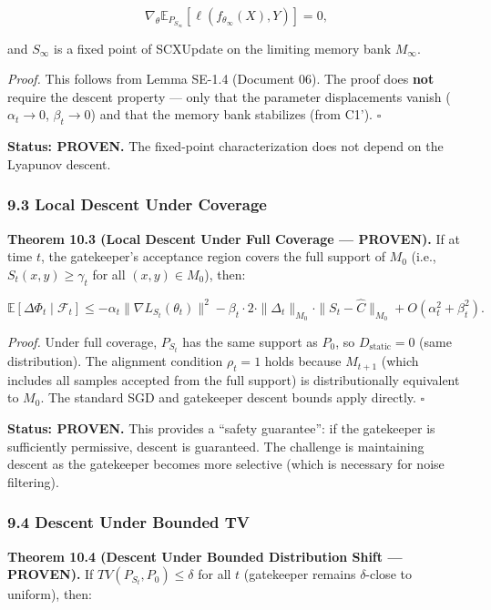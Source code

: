 \documentclass[
  12pt,
]{ctexart}
\begin{document}
\[\nabla_\theta \mathbb{E}_{P_{S_\infty}}[\ell(f_{\theta_\infty}(X), Y)] = 0,\]

and \(S_\infty\) is a fixed point of SCXUpdate on the limiting memory
bank \(M_\infty\).

\emph{Proof.} This follows from Lemma SE-1.4 (Document 06). The proof
does \textbf{not} require the descent property --- only that the
parameter displacements vanish (\(\alpha_t \to 0\), \(\beta_t \to 0\))
and that the memory bank stabilizes (from C1'). \(\square\)

\textbf{Status: PROVEN.} The fixed-point characterization does not
depend on the Lyapunov descent.

\subsubsection{9.3 Local Descent Under
Coverage}\label{local-descent-under-coverage}

\textbf{Theorem 10.3 (Local Descent Under Full Coverage --- PROVEN).} If
at time \(t\), the gatekeeper's acceptance region covers the full
support of \(M_0\) (i.e., \(S_t(x,y) \geq \gamma_t\) for all
\((x,y) \in M_0\)), then:

\[\mathbb{E}[\Delta\Phi_t \mid \mathcal{F}_t] \leq -\alpha_t \|\nabla L_{S_t}(\theta_t)\|^2 - \beta_t \cdot 2 \cdot \|\Delta_t\|_{M_0} \cdot \|S_t - \hat{C}\|_{M_0} + O(\alpha_t^2 + \beta_t^2).\]

\emph{Proof.} Under full coverage, \(P_{S_t}\) has the same support as
\(P_0\), so \(D_{\text{static}} = 0\) (same distribution). The alignment
condition \(\rho_t = 1\) holds because \(M_{t+1}\) (which includes all
samples accepted from the full support) is distributionally equivalent
to \(M_0\). The standard SGD and gatekeeper descent bounds apply
directly. \(\square\)

\textbf{Status: PROVEN.} This provides a ``safety guarantee'': if the
gatekeeper is sufficiently permissive, descent is guaranteed. The
challenge is maintaining descent as the gatekeeper becomes more
selective (which is necessary for noise filtering).

\subsubsection{9.4 Descent Under Bounded
TV}\label{descent-under-bounded-tv}

\textbf{Theorem 10.4 (Descent Under Bounded Distribution Shift ---
PROVEN).} If \(TV(P_{S_t}, P_0) \leq \delta\) for all \(t\) (gatekeeper
remains \(\delta\)-close to uniform), then:
\end{document}
